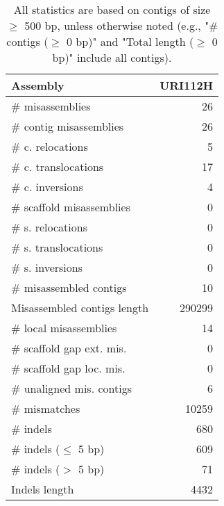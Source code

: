 \documentclass[12pt,a4paper]{article}
\begin{document}
\begin{table}[ht]
\begin{center}
\caption{All statistics are based on contigs of size $\geq$ 500 bp, unless otherwise noted (e.g., "\# contigs ($\geq$ 0 bp)" and "Total length ($\geq$ 0 bp)" include all contigs).}
\begin{tabular}{|l*{1}{|r}|}
\hline
Assembly & URI112H \\ \hline
\# misassemblies & 26 \\ \hline
\hspace{2mm}\# contig misassemblies & 26 \\ \hline
\hspace{5mm}\# c. relocations & 5 \\ \hline
\hspace{5mm}\# c. translocations & 17 \\ \hline
\hspace{5mm}\# c. inversions & 4 \\ \hline
\hspace{2mm}\# scaffold misassemblies & 0 \\ \hline
\hspace{5mm}\# s. relocations & 0 \\ \hline
\hspace{5mm}\# s. translocations & 0 \\ \hline
\hspace{5mm}\# s. inversions & 0 \\ \hline
\# misassembled contigs & 10 \\ \hline
Misassembled contigs length & 290299 \\ \hline
\# local misassemblies & 14 \\ \hline
\# scaffold gap ext. mis. & 0 \\ \hline
\# scaffold gap loc. mis. & 0 \\ \hline
\# unaligned mis. contigs & 6 \\ \hline
\# mismatches & 10259 \\ \hline
\# indels & 680 \\ \hline
\hspace{5mm}\# indels ($\leq$ 5 bp) & 609 \\ \hline
\hspace{5mm}\# indels ($>$ 5 bp) & 71 \\ \hline
Indels length & 4432 \\ \hline
\end{tabular}
\end{center}
\end{table}
\end{document}
